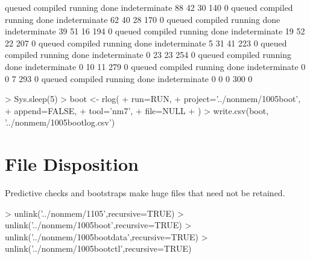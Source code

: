 \begin{Schunk}
\begin{Soutput}
       queued      compiled       running          done indeterminate 
           88            42            30           140             0 
       queued      compiled       running          done indeterminate 
           62            40            28           170             0 
       queued      compiled       running          done indeterminate 
           39            51            16           194             0 
       queued      compiled       running          done indeterminate 
           19            52            22           207             0 
       queued      compiled       running          done indeterminate 
            5            31            41           223             0 
       queued      compiled       running          done indeterminate 
            0            23            23           254             0 
       queued      compiled       running          done indeterminate 
            0            10            11           279             0 
       queued      compiled       running          done indeterminate 
            0             0             7           293             0 
       queued      compiled       running          done indeterminate 
            0             0             0           300             0 
\end{Soutput}
\begin{Sinput}
> Sys.sleep(5)
> boot <- rlog(
+ 	run=RUN,
+ 	project='../nonmem/1005boot',
+ 	append=FALSE,
+ 	tool='nm7',
+   file=NULL
+ )
> write.csv(boot, '../nonmem/1005bootlog.csv')
\end{Sinput}
\end{Schunk}
\section{File Disposition}
Predictive checks and bootstraps make huge files that need not be retained.
\begin{Schunk}
\begin{Sinput}
> unlink('../nonmem/1105',recursive=TRUE)
> unlink('../nonmem/1005boot',recursive=TRUE)
> unlink('../nonmem/1005bootdata',recursive=TRUE)
> unlink('../nonmem/1005bootctl',recursive=TRUE)
\end{Sinput}
\end{Schunk}


